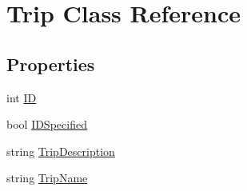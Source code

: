 \hypertarget{class_trip}{
\section{Trip Class Reference}
\label{class_trip}
}


 
\subsection*{Properties}
\begin{DoxyCompactItemize}
\item 
\hypertarget{class_trip_abe6972fc612a3749b72c1c12661cc8ad}{
int \hyperlink{class_trip_abe6972fc612a3749b72c1c12661cc8ad}{ID}}
\label{class_trip_abe6972fc612a3749b72c1c12661cc8ad}

\begin{DoxyCompactList}\small\item\em \item\end{DoxyCompactList}\item 
\hypertarget{class_trip_a64ada2f526601cd1b34f6d771157f6aa}{
bool \hyperlink{class_trip_a64ada2f526601cd1b34f6d771157f6aa}{IDSpecified}}
\label{class_trip_a64ada2f526601cd1b34f6d771157f6aa}

\begin{DoxyCompactList}\small\item\em \item\end{DoxyCompactList}\item 
\hypertarget{class_trip_aa475109330f8c1f06f1b923fdeb792d8}{
string \hyperlink{class_trip_aa475109330f8c1f06f1b923fdeb792d8}{TripDescription}}
\label{class_trip_aa475109330f8c1f06f1b923fdeb792d8}

\begin{DoxyCompactList}\small\item\em \item\end{DoxyCompactList}\item 
\hypertarget{class_trip_ab3178ccd1a3906add6132cd72668c11e}{
string \hyperlink{class_trip_ab3178ccd1a3906add6132cd72668c11e}{TripName}}
\label{class_trip_ab3178ccd1a3906add6132cd72668c11e}


\end{DoxyCompactItemize}

